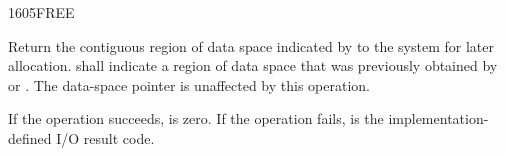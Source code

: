 \vspace*{-3ex}
\begin{worddef}{1605}{FREE}
\item {}

	Return the contiguous region of data space indicated by
	 to the system for later allocation. 
	shall indicate a region of data space that was previously
	obtained by  or . The data-space
	pointer is unaffected by this operation.

	If the operation succeeds,  is zero. If the operation
	fails,  is the implementation-defined I/O result code.


	\begin{testing} %
	\end{testing}
\end{worddef}

